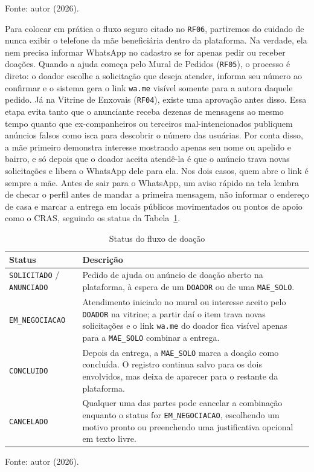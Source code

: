 \begin{table}[H]
{\small Fonte: autor (2026).}
\end{table}

Para colocar em prática o fluxo seguro citado no \texttt{RF06}, partiremos do cuidado de nunca exibir o telefone da mãe beneficiária dentro da plataforma. Na verdade, ela nem precisa informar WhatsApp no cadastro se for apenas pedir ou receber doações. Quando a ajuda começa pelo Mural de Pedidos (\texttt{RF05}), o processo é direto: o doador escolhe a solicitação que deseja atender, informa seu número ao confirmar e o sistema gera o link \texttt{wa.me} visível somente para a autora daquele pedido. Já na Vitrine de Enxovais (\texttt{RF04}), existe uma aprovação antes disso. Essa etapa evita tanto que o anunciante receba dezenas de mensagens ao mesmo tempo quanto que ex-companheiros ou terceiros mal-intencionados publiquem anúncios falsos como isca para descobrir o número das usuárias. Por conta disso, a mãe primeiro demonstra interesse mostrando apenas seu nome ou apelido e bairro, e só depois que o doador aceita atendê-la é que o anúncio trava novas solicitações e libera o WhatsApp dele para ela. Nos dois casos, quem abre o link é sempre a mãe. Antes de sair para o WhatsApp, um aviso rápido na tela lembra de checar o perfil antes de mandar a primeira mensagem, não informar o endereço de casa e marcar a entrega em locais públicos movimentados ou pontos de apoio como o CRAS, seguindo os status da Tabela~\ref{tab:status}.

\begin{table}[H]
\centering
\singlespacing
\caption{Status do fluxo de doação}
\label{tab:status}
\small
\begin{tabular}{p{3.7cm}p{11.0cm}}
\toprule
\textbf{Status} & \textbf{Descrição} \\
\midrule
\texttt{SOLICITADO} / \texttt{ANUNCIADO} & Pedido de ajuda ou anúncio de doação aberto na plataforma, à espera de um \texttt{DOADOR} ou de uma \texttt{MAE\_SOLO}. \\
\addlinespace
\texttt{EM\_NEGOCIACAO} & Atendimento iniciado no mural ou interesse aceito pelo \texttt{DOADOR} na vitrine; a partir daí o item trava novas solicitações e o link \texttt{wa.me} do doador fica visível apenas para a \texttt{MAE\_SOLO} combinar a entrega. \\
\addlinespace
\texttt{CONCLUIDO} & Depois da entrega, a \texttt{MAE\_SOLO} marca a doação como concluída. O registro continua salvo para os dois envolvidos, mas deixa de aparecer para o restante da plataforma. \\
\addlinespace
\texttt{CANCELADO} & Qualquer uma das partes pode cancelar a combinação enquanto o status for \texttt{EM\_NEGOCIACAO}, escolhendo um motivo pronto ou preenchendo uma justificativa opcional em texto livre. \\
\bottomrule
\end{tabular}
\vspace{0.15cm}

{\small Fonte: autor (2026).}
\end{table}

